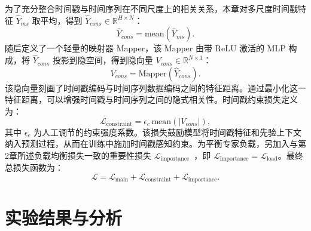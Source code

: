 为了充分整合时间戳与时间序列在不同尺度上的相关关系，本章对多尺度时间戳特征 $\hat{Y}_{ms}$ 取平均，得到 $\hat{Y}_{cons}\in\mathbb{R}^{H\times N}$：
\begin{equation}
\hat{Y}_{cons}=\mathrm{mean}\!\left(\hat{Y}_{ms}\right).
\end{equation}
随后定义了一个轻量的映射器 Mapper，该 Mapper 由带 ReLU 激活的 MLP 构成，将 $\hat{Y}_{cons}$ 投影到隐空间，得到隐向量 $V_{cons}\in\mathbb{R}^{N\times 1}$：
\begin{equation}
V_{cons}=\mathrm{Mapper}\!\left(\hat{Y}_{cons}\right).
\end{equation}
该隐向量刻画了时间戳编码与时间序列数据编码之间的特征距离。通过最小化这一特征距离，可以增强时间戳与时间序列之间的隐式相关性。时间戳约束损失定义为：
\begin{equation}
\mathcal{L}_{\mathrm{constraint}}=\epsilon_c\,\mathrm{mean}\!\left(\left|V_{cons}\right|\right),
\end{equation}
其中 $\epsilon_c$ 为人工调节的约束强度系数。该损失鼓励模型将时间戳特征和先验上下文纳入预测过程，从而在训练中施加时间戳感知约束。为平衡专家负载，另加入与第2章所述负载均衡损失一致的重要性损失 $\mathcal{L}_{\mathrm{importance}}$~\cite{moe}，即 $\mathcal{L}_{\mathrm{importance}}=\mathcal{L}_{\mathrm{load}}$。最终总损失函数为：
\begin{equation}
\mathcal{L}=\mathcal{L}_{\mathrm{main}}+\mathcal{L}_{\mathrm{constraint}}+\mathcal{L}_{\mathrm{importance}}.
\end{equation}

\section{实验结果与分析}

